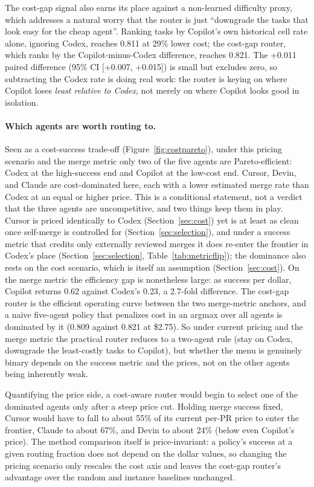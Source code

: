 \documentclass[sigconf,nonacm]{acmart}
\begin{document}
The cost-gap signal also earns its place against a non-learned difficulty proxy, which addresses a natural worry that the router is just ``downgrade the tasks that look easy for the cheap agent''. Ranking tasks by Copilot's own historical cell rate alone, ignoring Codex, reaches 0.811 at 29\% lower cost; the cost-gap router, which ranks by the Copilot-minus-Codex difference, reaches 0.821. The +0.011 paired difference (95\% CI [+0.007, +0.015]) is small but excludes zero, so subtracting the Codex rate is doing real work: the router is keying on where Copilot loses \emph{least relative to Codex}, not merely on where Copilot looks good in isolation.

\paragraph{Which agents are worth routing to.} Seen as a cost-success trade-off (Figure~\ref{fig:costpareto}), under this pricing scenario and the merge metric only two of the five agents are Pareto-efficient: Codex at the high-success end and Copilot at the low-cost end. Cursor, Devin, and Claude are cost-dominated here, each with a lower estimated merge rate than Codex at an equal or higher price. This is a conditional statement, not a verdict that the three agents are uncompetitive, and two things keep them in play. Cursor is priced identically to Codex (Section~\ref{sec:cost}) yet is at least as clean once self-merge is controlled for (Section~\ref{sec:selection}), and under a success metric that credits only externally reviewed merges it does re-enter the frontier in Codex's place (Section~\ref{sec:selection}, Table~\ref{tab:metricflip}); the dominance also rests on the cost scenario, which is itself an assumption (Section~\ref{sec:cost}). On the merge metric the efficiency gap is nonetheless large: as success per dollar, Copilot returns 0.62 against Codex's 0.23, a 2.7-fold difference. The cost-gap router is the efficient operating curve between the two merge-metric anchors, and a naive five-agent policy that penalizes cost in an argmax over all agents is dominated by it (0.809 against 0.821 at \$2.75). So under current pricing and the merge metric the practical router reduces to a two-agent rule (stay on Codex, downgrade the least-costly tasks to Copilot), but whether the menu is genuinely binary depends on the success metric and the prices, not on the other agents being inherently weak.

Quantifying the price side, a cost-aware router would begin to select one of the dominated agents only after a steep price cut. Holding merge success fixed, Cursor would have to fall to about 55\% of its current per-PR price to enter the frontier, Claude to about 67\%, and Devin to about 24\% (below even Copilot's price). The method comparison itself is price-invariant: a policy's success at a given routing fraction does not depend on the dollar values, so changing the pricing scenario only rescales the cost axis and leaves the cost-gap router's advantage over the random and instance baselines unchanged.
\end{document}
